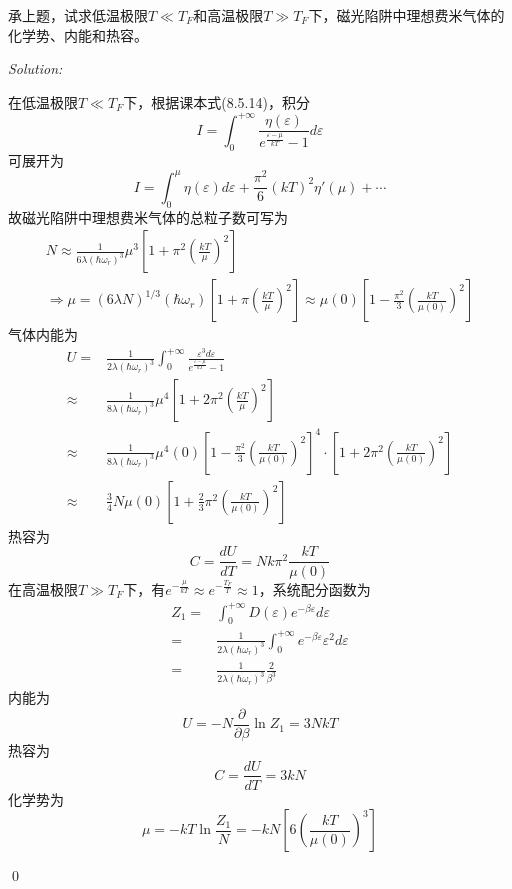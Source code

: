 \documentclass[12pt,a4paper]{article}
\newenvironment{problem}[2][Problem]{\begin{trivlist}
\item[\hskip \labelsep {\bfseries #1}\hskip \labelsep {\bfseries #2.}]}{\end{trivlist}}
\newenvironment{sol}
    {\emph{Solution:}
    }
    {
    \qed
    }
\begin{document}
\begin{problem}{8.23}
承上题，试求低温极限$T\ll T_F$和高温极限$T\gg T_F$下，磁光陷阱中理想费米气体的化学势、内能和热容。
\end{problem}
\begin{sol}
在低温极限$T\ll T_F$下，根据课本式(8.5.14)，积分
\begin{equation}
I=\int_0^{+\infty}\frac{\eta(\varepsilon)}{e^{\frac{\varepsilon-\mu}{kT}}-1}d\varepsilon
\end{equation}
可展开为
\begin{equation}
I=\int_0^{\mu}\eta(\varepsilon)d\varepsilon+\frac{\pi^2}{6}(kT)^2\eta'(\mu)+\cdots
\end{equation}
故磁光陷阱中理想费米气体的总粒子数可写为
\begin{gather}
N\approx\frac{1}{6\lambda(\hbar\omega_r)^3}\mu^3\left[1+\pi^2\left(\frac{kT}{\mu}\right)^2\right]\\
\Longrightarrow\mu=(6\lambda N)^{1/3}(\hbar\omega_r)\left[1+\pi\left(\frac{kT}{\mu}\right)^2\right]\approx\mu(0)\left[1-\frac{\pi^2}{3}\left(\frac{kT}{\mu(0)}\right)^2\right]
\end{gather}
气体内能为
\begin{align}
\nonumber U=&\frac{1}{2\lambda(\hbar\omega_r)^3}\int_0^{+\infty}\frac{\varepsilon^3d\varepsilon}{e^{\frac{\varepsilon-\mu}{kT}}-1}\\
\nonumber\approx&\frac{1}{8\lambda(\hbar\omega_r)^3}\mu^4\left[1+2\pi^2\left(\frac{kT}{\mu}\right)^2\right]\\
\nonumber\approx&\frac{1}{8\lambda(\hbar\omega_r)^3}\mu^4(0)\left[1-\frac{\pi^2}{3}\left(\frac{kT}{\mu(0)}\right)^2\right]^4\cdot\left[1+2\pi^2\left(\frac{kT}{\mu(0)}\right)^2\right]\\
\approx&\frac{3}{4}N\mu(0)\left[1+\frac{2}{3}\pi^2\left(\frac{kT}{\mu(0)}\right)^2\right]
\end{align}
热容为
\begin{equation}
C=\frac{dU}{dT}=Nk\pi^2\frac{kT}{\mu(0)}
\end{equation}
在高温极限$T\gg T_F$下，有$e^{-\frac{\mu}{kT}}\approx e^{-\frac{T_F}{T}}\approx1$，系统配分函数为
\begin{align}
\nonumber Z_1=&\int_0^{+\infty}D(\varepsilon)e^{-\beta\varepsilon}d\varepsilon\\
\nonumber=&\frac{1}{2\lambda(\hbar\omega_r)^3}\int_0^{+\infty}e^{-\beta\varepsilon}\varepsilon^2d\varepsilon\\
=&\frac{1}{2\lambda(\hbar\omega_r)^3}\frac{2}{\beta^3}
\end{align}
内能为
\begin{equation}
U=-N\frac{\partial}{\partial\beta}\ln Z_1=3NkT
\end{equation}
热容为
\begin{equation}
C=\frac{dU}{dT}=3kN
\end{equation}
化学势为
\begin{equation}
\mu=-kT\ln\frac{Z_1}{N}=-kN\left[6\left(\frac{kT}{\mu(0)}\right)^3\right]
\end{equation}
\end{sol}
\end{document}
